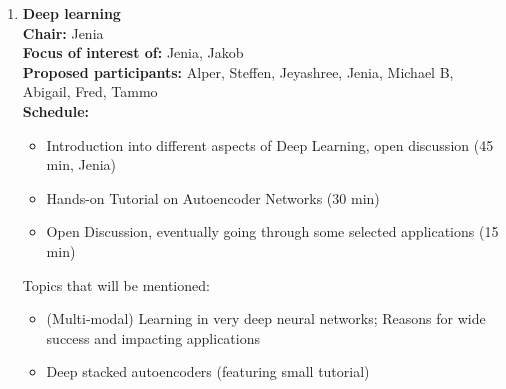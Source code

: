 \documentclass[10pt, a4paper,twoside,american]{article}
\begin{document}
\begin{enumerate}[resume]
\item {\large\bf Deep learning}\\[1ex]
  {\bf Chair:} Jenia \\[1ex]
  {\bf Focus of interest of:} Jenia, Jakob\\[1ex]
  {\bf Proposed participants:} Alper, Steffen, Jeyashree, Jenia, Michael B, Abigail, Fred, Tammo\\[1ex]
  {\bf Schedule:}
  \begin{itemize}
  \item Introduction into different aspects of Deep Learning, open discussion (45 min, Jenia)
  \item Hands-on Tutorial on Autoencoder Networks (30 min)
  \item Open Discussion, eventually going through some selected applications (15 min)
  \end{itemize}
  
  Topics that will be mentioned:
  \begin{itemize}
  \item (Multi-modal) Learning in very deep neural networks; Reasons for wide success and impacting applications
  \item  Deep stacked autoencoders (featuring small tutorial)
  \end{itemize}
\end{enumerate}

\end{document}
